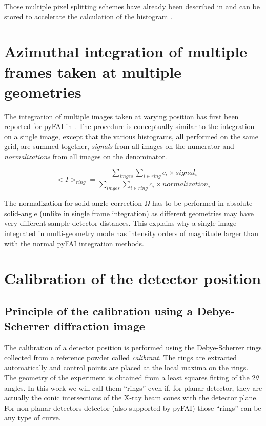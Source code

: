 \documentclass[preprint, pdf]{iucr}              %
\begin{document}
Those multiple pixel splitting schemes have already been described in
 \cite{fv5028} and can be stored to accelerate the calculation of the
histogram  \cite{kieffer_ashiotis-proc-euroscipy-2014}.

\section{Azimuthal integration of multiple frames taken at multiple geometries}

The integration of multiple images taken at varying position has first been
reported for pyFAI in  \cite{PyFAI_PDJ}. 
The procedure is conceptually similar to the integration on a single image,
except that the various histograms, all performed on the same grid, are summed
together, \textit{signals} from all images on the numerator and
\textit{normalizations} from all images on the denominator.

$$
<I>_{ring} = \frac{\sum\limits_{imges} \sum\limits_{i \in ring} c_i \times
signal_i} {\sum\limits_{imges} \sum\limits_{i \in ring} c_i \times
normalization_i} 
$$

The normalization for solid angle correction $\Omega$ has to be performed in
absolute solid-angle (unlike in single frame integration) as different
geometries may have very different sample-detector distances. 
This explains why a single image integrated in multi-geometry mode  has
intensity orders of magnitude larger than with the normal pyFAI integration
methods.

\section{Calibration of the detector position}

\subsection{Principle of the calibration using a Debye-Scherrer diffraction
image}
The calibration of a detector position is performed using the Debye-Scherrer
rings collected from a reference powder called \textit{calibrant}.
The rings are extracted automatically and control points are placed at the
local maxima on the rings.
The geometry of the experiment is obtained from a least squares fitting of
the $2\theta$ angles.
In this work we will call them ``rings'' even if, for planar detector,
they are actually the conic intersections of the X-ray beam cones
with the detector plane.
For non planar detectors detector (also supported by pyFAI) those ``rings'' can
be any type of curve.
\end{document}
